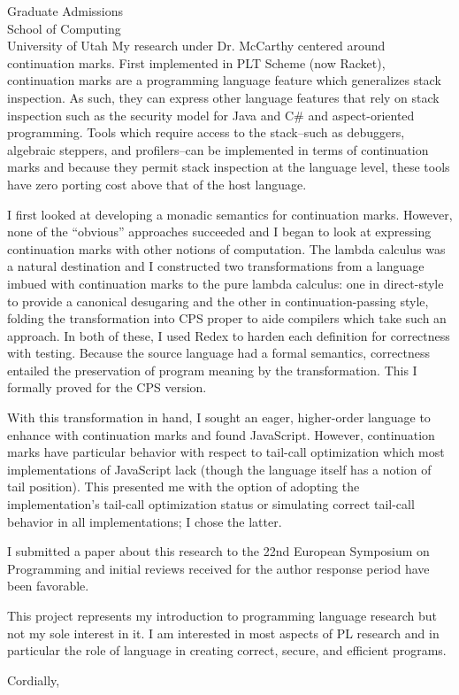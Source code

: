 \documentclass{letter}
\begin{document}
\begin{letter}{Graduate Admissions\\ School of Computing\\ University of Utah}
My research under Dr. McCarthy centered around continuation marks. First implemented in PLT Scheme (now Racket), continuation marks are a programming language feature which generalizes stack inspection. As such, they can express other language features that rely on stack inspection such as the security model for Java and C\# and aspect-oriented programming. Tools which require access to the stack--such as debuggers, algebraic steppers, and profilers--can be implemented in terms of continuation marks and because they permit stack inspection at the language level, these tools have zero porting cost above that of the host language.

I first looked at developing a monadic semantics for continuation marks. However, none of the ``obvious'' approaches succeeded and I began to look at expressing continuation marks with other notions of computation. The lambda calculus was a natural destination and I constructed two transformations from a language imbued with continuation marks to the pure lambda calculus: one in direct-style to provide a canonical desugaring and the other in continuation-passing style, folding the transformation into CPS proper to aide compilers which take such an approach. In both of these, I used Redex to harden each definition for correctness with testing. Because the source language had a formal semantics, correctness entailed the preservation of program meaning by the transformation. This I formally proved for the CPS version.

With this transformation in hand, I sought an eager, higher-order language to enhance with continuation marks and found JavaScript. However, continuation marks have particular behavior with respect to tail-call optimization which most implementations of JavaScript lack (though the language itself has a notion of tail position). This presented me with the option of adopting the implementation's tail-call optimization status or simulating correct tail-call behavior in all implementations; I chose the latter.

I submitted a paper about this research to the 22nd European Symposium on Programming and initial reviews received for the author response period have been favorable.

This project represents my introduction to programming language research but not my sole interest in it. I am interested in most aspects of PL research and in particular the role of language in creating correct, secure, and efficient programs.

\closing{Cordially,}
\end{letter}
\end{document}
